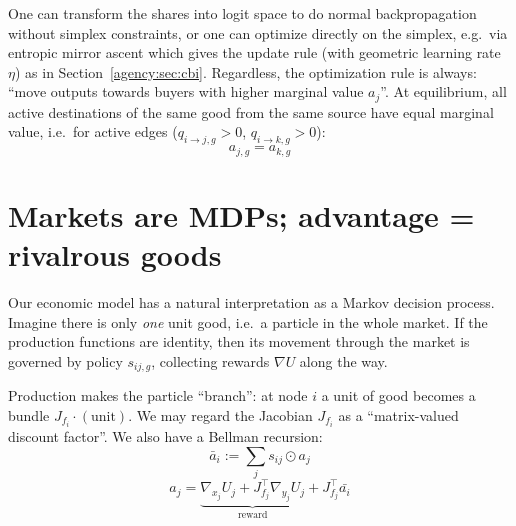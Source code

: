 One can transform the shares into logit space to do normal backpropagation without simplex
constraints, or one can optimize directly on the simplex, e.g.\ via entropic mirror
ascent which gives the update rule (with geometric learning rate $\eta$) as in
Section~\ref{agency:sec:cbi}. Regardless, the optimization rule is always: ``move outputs
towards buyers with higher marginal value $a_j$''. At equilibrium, all active destinations
of the same good from the same source have equal marginal value, i.e.\ for active edges
($q_{i\to j,g}>0$, $q_{i\to k,g}>0$):
\[a_{j,g}=a_{k,g}\]

\section{Markets are MDPs; advantage = rivalrous goods}\label{agency:sec:mdp}

Our economic model has a natural interpretation as a Markov decision process. Imagine there is only \emph{one} unit
good, i.e.\ a particle in the whole market. If the production functions are identity, then
its movement through the market is governed by policy $s_{ij,g}$, collecting rewards
$\nabla U$ along the way.

Production makes the particle ``branch'': at node $i$ a unit of good becomes a bundle
$J_{f_i} \cdot (\text{unit})$. We may regard the Jacobian $J_{f_i}$ as a ``matrix-valued
discount factor''. We also have a Bellman recursion:
\begin{equation}
\bar a_{i} := \sum_j s_{ij}\odot a_{j}\label{agency:eq:vbar}
\end{equation}
\begin{equation}
a_j = \underbrace{\nabla_{x_j} U_j+ J_{f_j}^\top\nabla_{y_j} U_j}_{\text{reward}} + J_{f_j}^\top \bar{a_i}\label{agency:eq:bellman}
\end{equation}

